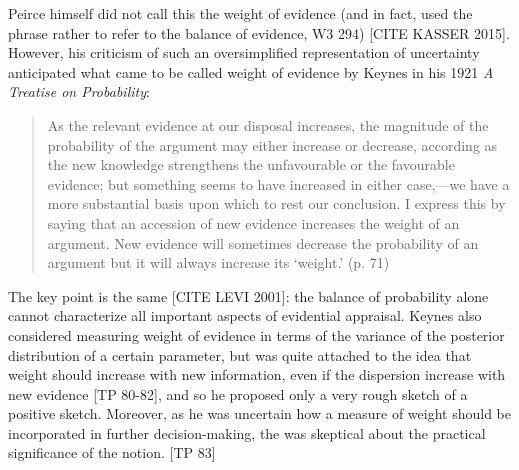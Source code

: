 \documentclass[
  10pt,
  dvipsnames,enabledeprecatedfontcommands]{scrartcl}
\begin{document}
Peirce himself did not call this the weight of evidence (and in fact,
used the phrase rather to refer to the balance of evidence, W3 294)
{[}CITE KASSER 2015{]}. However, his criticism of such an oversimplified
representation of uncertainty anticipated what came to be called weight
of evidence by Keynes in his 1921 \emph{A Treatise on Probability}:

\begin{quote}
As the relevant evidence at our disposal increases, the magnitude of the
probability of the argument may either increase or decrease, according as the new knowledge strengthens the unfavourable or the favourable evidence; but something seems to have increased in either case,—we have a more substantial basis upon which to rest our conclusion. I express this by saying that an accession of new evidence increases the weight of an argument. New evidence will sometimes decrease the probability of an argument but it will always increase its `weight.' (p. 71)
\end{quote}

\noindent The key point is the same {[}CITE LEVI 2001{]}: the balance of
probability alone cannot characterize all important aspects of
evidential appraisal. Keynes also considered measuring weight of
evidence in terms of the variance of the posterior distribution of a
certain parameter, but was quite attached to the idea that weight should
increase with new information, even if the dispersion increase with new
evidence {[}TP 80-82{]}, and so he proposed only a very rough sketch of
a positive sketch. Moreover, as he was uncertain how a measure of weight
should be incorporated in further decision-making, the was skeptical
about the practical significance of the notion. {[}TP 83{]}
\end{document}
